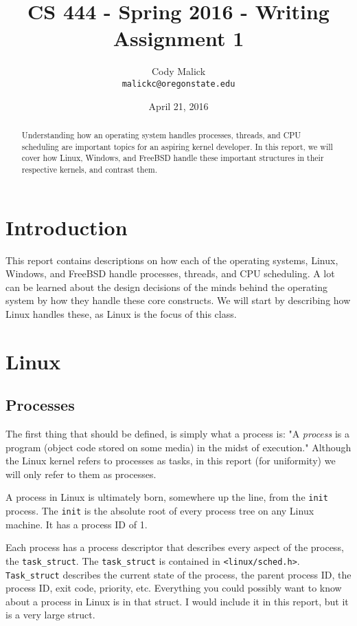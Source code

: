 \documentclass[10pt,letterpaper,onecolumn,draftclsnofoot]{IEEEtran}
\begin{document}
\begin{titlepage}
  \title{CS 444 - Spring 2016 - Writing Assignment 1}
  \author{Cody Malick\\
  \texttt{malickc@oregonstate.edu}}
  \date{April 21, 2016}
  \maketitle
  \vspace*{4cm}
  \begin{abstract}
      \noindent Understanding how an operating system handles processes, threads,
      and CPU scheduling are important topics for an aspiring kernel developer.
      In this report, we will cover how Linux, Windows, and FreeBSD handle these
      important structures in their respective kernels, and contrast them.
  \end{abstract}
\end{titlepage}

\tableofcontents
\clearpage
\section{Introduction}
This report contains descriptions on how each of the operating systems, Linux,
Windows, and FreeBSD handle processes, threads, and CPU scheduling. A lot can be
learned about the design decisions of the minds behind the operating system by
how they handle these core constructs. We will start by describing how Linux
handles these, as Linux is the focus of this class.

\section{Linux}
  \subsection{Processes}
The first thing that should be defined, is simply what a process is: "A
\textit{process} is a program (object code stored on some media) in the midst of
execution."\cite{robertlove2010} Although the Linux kernel refers to processes
as tasks, in this report (for uniformity) we will only refer to them as processes.

A process in Linux is ultimately born, somewhere up the line, from the
\texttt{init} process. The \texttt{init} is the absolute root of every process
tree on any Linux machine. It has a process ID of 1.

Each process has a process descriptor that describes every aspect of
the process, the \texttt{task\_struct}. The \texttt{task\_struct} is contained
in \texttt{<linux/sched.h>}. \texttt{Task\_struct} describes the current state
of the process, the parent process ID, the process ID, exit code, priority, etc.
Everything you could possibly want to know about a process in Linux is in that
struct. I would include it in this report, but it is a very large struct.
\end{document}
